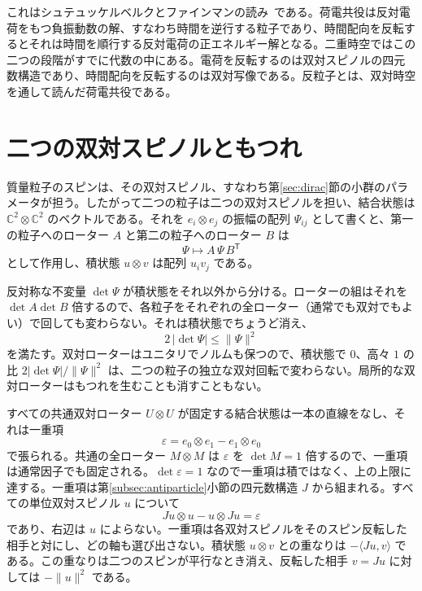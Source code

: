 \documentclass[a4paper]{article}
\begin{document}
これはシュテュッケルベルクとファインマンの読み~\cite{stueckelberg1941,feynman1949}である。荷電共役は反対電荷をもつ負振動数の解、すなわち時間を逆行する粒子であり、時間配向を反転するとそれは時間を順行する反対電荷の正エネルギー解となる。二重時空ではこの二つの段階がすでに代数の中にある。電荷を反転するのは双対スピノルの四元数構造であり、時間配向を反転するのは双対写像である。反粒子とは、双対時空を通して読んだ荷電共役である。

\section{二つの双対スピノルともつれ}
\label{sec:entanglement}

質量粒子のスピンは、その双対スピノル、すなわち第\ref{sec:dirac}節の小群のパラメータが担う。したがって二つの粒子は二つの双対スピノルを担い、結合状態は $\mathbb{C}^2\otimes\mathbb{C}^2$ のベクトルである。それを $e_i\otimes e_j$ の振幅の配列 $\Psi_{ij}$ として書くと、第一の粒子へのローター $A$ と第二の粒子へのローター $B$ は
\[
\Psi\mapsto A\,\Psi\,B^{\mathsf T}
\]
として作用し、積状態 $u\otimes v$ は配列 $u_iv_j$ である。

反対称な不変量 $\det\Psi$ が積状態をそれ以外から分ける。ローターの組はそれを $\det A\det B$ 倍するので、各粒子をそれぞれの全ローター（通常でも双対でもよい）で回しても変わらない。それは積状態でちょうど消え、
\[
2\,|\det\Psi|\le\lVert\Psi\rVert^2
\]
を満たす。双対ローターはユニタリでノルムも保つので、積状態で $0$、高々 $1$ の比 $2|\det\Psi|/\lVert\Psi\rVert^2$ は、二つの粒子の独立な双対回転で変わらない。局所的な双対ローターはもつれを生むことも消すこともない。

すべての共通双対ローター $U\otimes U$ が固定する結合状態は一本の直線をなし、それは一重項
\[
\varepsilon=e_0\otimes e_1-e_1\otimes e_0
\]
で張られる。共通の全ローター $M\otimes M$ は $\varepsilon$ を $\det M=1$ 倍するので、一重項は通常因子でも固定される。$\det\varepsilon=1$ なので一重項は積ではなく、上の上限に達する。一重項は第\ref{subsec:antiparticle}小節の四元数構造 $J$ から組まれる。すべての単位双対スピノル $u$ について
\[
Ju\otimes u-u\otimes Ju=\varepsilon
\]
であり、右辺は $u$ によらない。一重項は各双対スピノルをそのスピン反転した相手と対にし、どの軸も選び出さない。積状態 $u\otimes v$ との重なりは $-\langle Ju,v\rangle$ である。この重なりは二つのスピンが平行なとき消え、反転した相手 $v=Ju$ に対しては $-\lVert u\rVert^2$ である。
\end{document}
